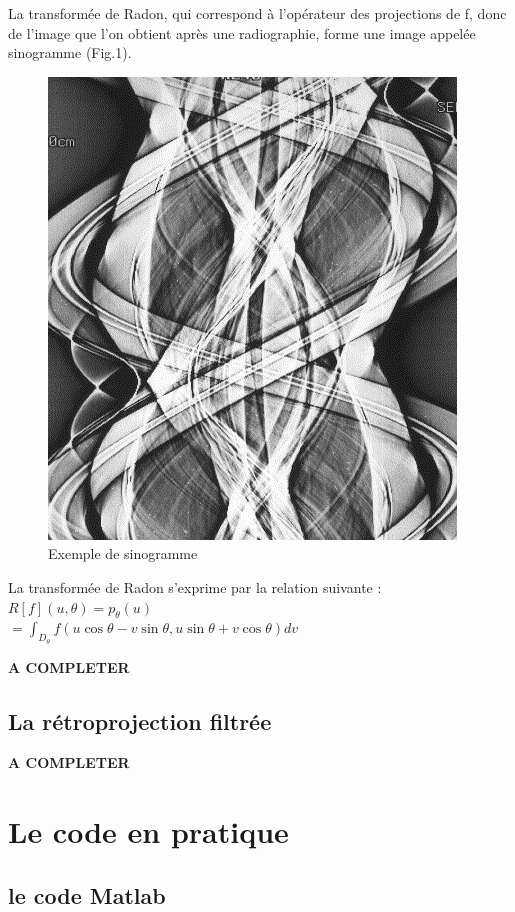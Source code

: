 \documentclass[conference]{IEEEtran}
\begin{document}
La transformée de Radon, qui correspond à l'opérateur des projections de f, donc de l'image que l'on obtient après une radiographie, forme une image appelée sinogramme (Fig.1). 

\begin{figure}[H]
\centering
\includegraphics[scale=0.4]{sinogrammeExemple}
\caption[Exemple de sinogramme]{Exemple de sinogramme}
\label{fig:gallery}
\end{figure}

La transformée de Radon s'exprime par la relation suivante :
$R[f](u,\theta)=p_\theta(u)$
\\%
$=\int_{D_\theta} f(u\cos\theta-v\sin\theta, u\sin\theta+v\cos\theta)dv$

\textbf{A COMPLETER}

\subsection{La rétroprojection filtrée}

\textbf{A COMPLETER}


\section{Le code en pratique}

\subsection{le code Matlab}
\end{document}
